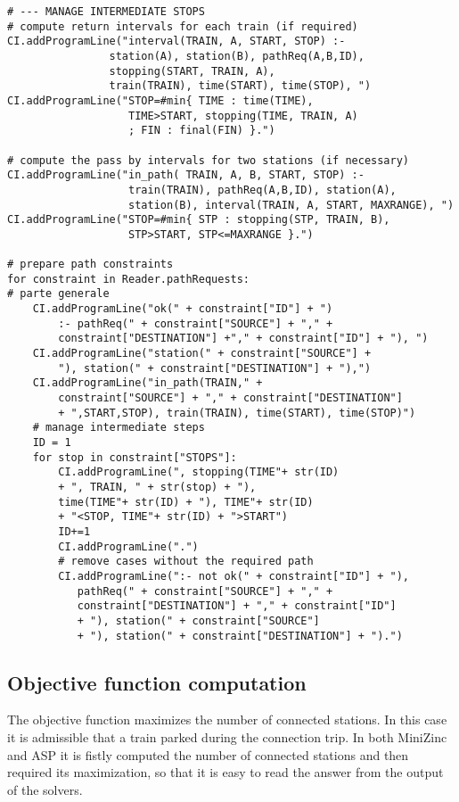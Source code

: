 \documentclass[11pt]{article}
\begin{document}
\begin{verbatim}
# --- MANAGE INTERMEDIATE STOPS
# compute return intervals for each train (if required)
CI.addProgramLine("interval(TRAIN, A, START, STOP) :-
                station(A), station(B), pathReq(A,B,ID), 
                stopping(START, TRAIN, A),
                train(TRAIN), time(START), time(STOP), ")
CI.addProgramLine("STOP=#min{ TIME : time(TIME), 
                   TIME>START, stopping(TIME, TRAIN, A)
                   ; FIN : final(FIN) }.")
    
# compute the pass by intervals for two stations (if necessary)
CI.addProgramLine("in_path( TRAIN, A, B, START, STOP) :- 
                   train(TRAIN), pathReq(A,B,ID), station(A),
                   station(B), interval(TRAIN, A, START, MAXRANGE), ")
CI.addProgramLine("STOP=#min{ STP : stopping(STP, TRAIN, B), 
                   STP>START, STP<=MAXRANGE }.")
    
# prepare path constraints
for constraint in Reader.pathRequests:
# parte generale
    CI.addProgramLine("ok(" + constraint["ID"] + ") 
        :- pathReq(" + constraint["SOURCE"] + "," +
        constraint["DESTINATION"] +"," + constraint["ID"] + "), ")
    CI.addProgramLine("station(" + constraint["SOURCE"] + 
        "), station(" + constraint["DESTINATION"] + "),")
    CI.addProgramLine("in_path(TRAIN," + 
        constraint["SOURCE"] + "," + constraint["DESTINATION"] 
        + ",START,STOP), train(TRAIN), time(START), time(STOP)")
    # manage intermediate steps
    ID = 1
    for stop in constraint["STOPS"]:
        CI.addProgramLine(", stopping(TIME"+ str(ID)
        + ", TRAIN, " + str(stop) + "),
        time(TIME"+ str(ID) + "), TIME"+ str(ID) 
        + "<STOP, TIME"+ str(ID) + ">START")
        ID+=1
        CI.addProgramLine(".")   
        # remove cases without the required path
        CI.addProgramLine(":- not ok(" + constraint["ID"] + "),
           pathReq(" + constraint["SOURCE"] + "," + 
           constraint["DESTINATION"] + "," + constraint["ID"] 
           + "), station(" + constraint["SOURCE"]
           + "), station(" + constraint["DESTINATION"] + ").")
\end{verbatim}

\subsection{Objective function computation}

The objective function maximizes the number of connected stations. In this 
case it is admissible that a train parked during the connection trip. 
In both MiniZinc and ASP it is fistly computed the number of 
connected stations and then required its maximization, so that it is
easy to read the answer from the output of the solvers. 
\end{document}
